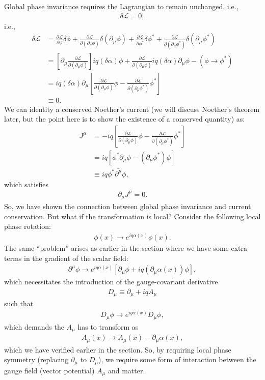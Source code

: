 \documentclass[a4paper,11pt]{article}
\numberwithin{equation}{section}
\theoremstyle{definition}
\newcommand{\p}{\partial}
\newcommand{\lag}{\mathcal{L}}
\begin{document}
Global phase invariance requires the Lagrangian to remain unchanged, i.e.,
\begin{align}
\delta \lag = 0,
\end{align}
i.e.,
\begin{align}
\delta\lag &= \frac{\p \lag}{\p \phi}\delta \phi + \frac{\p \lag}{\p (\p_\mu\phi)}\delta (\p_\mu\phi) + \frac{\p \lag}{\p \phi^*}\delta \phi^* + \frac{\p \lag}{\p (\p_\mu\phi^*)}\delta (\p_\mu\phi^*)\\
&= \left[ \p_\mu \frac{\p \lag}{\p (\p_\mu\phi)}   \right]iq(\delta \alpha)\phi + \frac{\p\lag}{\p(\p_\mu\phi)}iq(\delta \alpha)\p_\mu\phi - (\phi\to \phi^*)\\
&= iq(\delta \alpha)\p_\mu \left[ \frac{\p\lag}{\p(\p_\mu \phi)}\phi - \frac{\p\lag}{\p(\p_\mu \phi^*)}\phi^* \right]\\ 
&\equiv 0. 
\end{align}
We can identity a conserved Noether's current (we will discuss Noether's theorem later, but the point here is to show the existence of a conserved quantity) as:
\begin{align}
J^\mu &= -iq\left[ \frac{\p\lag}{\p(\p_\mu \phi)}\phi - \frac{\p\lag}{\p(\p_\mu \phi^*)}\phi^* \right]\\
&= iq\left[\phi^*\p_\mu\phi - (\p_\mu\phi^*)\phi\right]\\
&\equiv iq\phi^*\bar{\p^\mu}\phi,
\end{align}
which satisfies
\begin{align}
\p_\mu J^\mu = 0.
\end{align}
So, we have shown the connection between global phase invariance and current conservation. But what if the transformation is local? Consider the following local phase rotation:
\begin{align}
\phi(x) \to e^{iq\alpha(x)}\phi(x).
\end{align}
The same ``problem'' arises as earlier in the section where we have some extra terms in the gradient of the scalar field:
\begin{align}
\p^\mu \phi \to e^{iq\alpha(x)}\left[ \p_\mu\phi +  iq(\p_\mu \alpha(x))\phi \right],
\end{align}
which necessitates the introduction of the gauge-covariant derivative
\begin{align}
D_\mu \equiv \p_\mu + iq A_\mu
\end{align}
such that
\begin{align}
D_\mu\phi \to e^{iq\alpha(x)}D_\mu \phi,
\end{align}
which demands the $A_\mu$ has to transform as
\begin{align}
A_\mu(x) \to A_\mu(x) - \p_\mu \alpha(x),
\end{align}
which we have verified earlier in the section. So, by requiring local phase symmetry (replacing $\p_\mu$ to $D_\mu$), we require some form of interaction between the gauge field (vector potential) $A_\mu$ and matter. 
\end{document}
